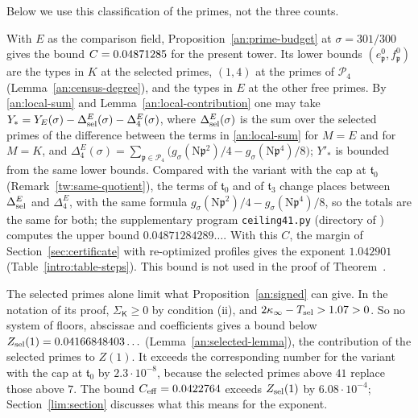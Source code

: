 Below we use this classification of the primes, not the three counts.


\begin{remark}\label{an:base-ceiling}
With $E$ as the comparison field, Proposition~\ref{an:prime-budget} at
$\sigma=301/300$ gives the bound $C=0.04871285$ for the present tower. Its
lower bounds
$(e^0_{\mathfrak p},f^0_{\mathfrak p})$ are the types in $K$ at the selected
primes, $(1,4)$ at the primes of $\mathcal P_4$
(Lemma~\ref{an:census-degree}), and the types in $E$ at the other free
primes. By \eqref{an:local-sum} and Lemma~\ref{an:local-contribution} one may
take $Y_*=Y_E(\sigma)-\Delta^E_{\rm sel}(\sigma)-\Delta^E_4(\sigma)$, where
$\Delta^E_{\rm sel}(\sigma)$ is the sum over the selected primes of the
difference between the terms in \eqref{an:local-sum} for $M=E$ and for
$M=K$, and
$\Delta^E_4(\sigma)=\sum_{\mathfrak p\in\mathcal P_4}\bigl(g_\sigma(\mathrm
N\mathfrak p^2)/4-g_\sigma(\mathrm N\mathfrak p^4)/8\bigr)$; $Y'_*$ is bounded
from the same lower bounds. Compared with the variant with the cap at
$\mathfrak t_0$ (Remark~\ref{tw:same-quotient}), the terms
of $\mathfrak t_0$ and of $\mathfrak t_3$ change places between $\Delta^E_{\rm sel}$ and
$\Delta^E_4$, with the same formula
$g_\sigma(\mathrm N\mathfrak p^2)/4-g_\sigma(\mathrm N\mathfrak p^4)/8$, so the
totals are the same for both; the supplementary program \texttt{ceiling41.py}
(directory  of \cite{NaslundCode4317})
computes the upper bound $0.04871284289\ldots$. With this
$C$, the margin of Section~\ref{sec:certificate} with re-optimized profiles
gives the exponent $1.042901$ (Table~\ref{intro:table-steps}). This bound is
not used in the proof of Theorem~.
\end{remark}

\begin{remark}\label{an:limit-remark}
The selected primes alone limit what Proposition~\ref{an:signed} can give.
In the notation of its proof, $\Sigma_{\mathsf K}\ge0$ by condition (ii), and
$2\kappa_\infty-T_{\rm sel}>1.07>0$. So no system of floors, abscissae and
coefficients gives a bound below
$Z_{\rm sel}(1)=0.04166848403\ldots$ (Lemma~\ref{an:selected-lemma}), the
contribution of the selected primes to $Z(1)$. It exceeds the corresponding
number for the variant with the cap at $\mathfrak t_0$ by $2.3\cdot10^{-8}$,
because the selected primes above $41$ replace those above $7$. The bound $C_{\rm eff}=0.0422764$
exceeds $Z_{\rm sel}(1)$ by $6.08\cdot10^{-4}$; Section~\ref{lim:section}
discusses what this means for the exponent.
\end{remark}

